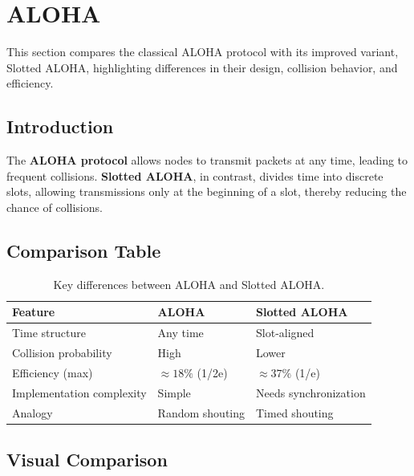 \section{ALOHA}

This section compares the classical ALOHA protocol with its improved variant, Slotted ALOHA, highlighting differences in their design, collision behavior, and efficiency.

\subsection{Introduction}

The \textbf{ALOHA protocol} allows nodes to transmit packets at any time, leading to frequent collisions. 
\textbf{Slotted ALOHA}, in contrast, divides time into discrete slots, allowing transmissions only at the beginning of a slot, thereby reducing the chance of collisions.

\cite{Abramson1970, Kleinrock1975}

\subsection{Comparison Table}

\begin{table}[h]
\centering
\begin{tabular}{@{}lll@{}}
\toprule
\textbf{Feature} & \textbf{ALOHA} & \textbf{Slotted ALOHA} \\
\midrule
Time structure & Any time & Slot-aligned \\
Collision probability & High & Lower \\
Efficiency (max) & $\approx 18\%$ (1/2e) & $\approx 37\%$ (1/e) \\
Implementation complexity & Simple & Needs synchronization \\
Analogy & Random shouting & Timed shouting \\
\bottomrule
\end{tabular}
\caption{Key differences between ALOHA and Slotted ALOHA.}
\end{table}

\subsection{Visual Comparison}

